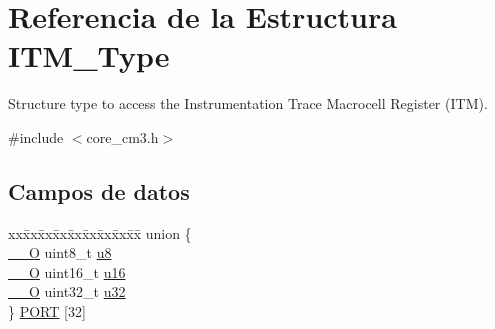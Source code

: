 \hypertarget{struct_i_t_m___type}{}\section{Referencia de la Estructura I\+T\+M\+\_\+\+Type}
\label{struct_i_t_m___type}


Structure type to access the Instrumentation Trace Macrocell Register (I\+TM).  




{\ttfamily \#include $<$core\+\_\+cm3.\+h$>$}

\subsection*{Campos de datos}
\begin{DoxyCompactItemize}
\item 
\begin{tabbing}
xx\=xx\=xx\=xx\=xx\=xx\=xx\=xx\=xx\=\kill
union \{\\
\>\mbox{\hyperlink{core__cm3_8h_a7e25d9380f9ef903923964322e71f2f6}{\_\_O}} uint8\_t \mbox{\hyperlink{struct_i_t_m___type_a0374c0b98ab9de6f71fabff7412df832}{u8}}\\
\>\mbox{\hyperlink{core__cm3_8h_a7e25d9380f9ef903923964322e71f2f6}{\_\_O}} uint16\_t \mbox{\hyperlink{struct_i_t_m___type_ae8d499140220fa6d4eab1da7262bf08e}{u16}}\\
\>\mbox{\hyperlink{core__cm3_8h_a7e25d9380f9ef903923964322e71f2f6}{\_\_O}} uint32\_t \mbox{\hyperlink{struct_i_t_m___type_acaf6d0e14a3d4b541c624913b4a1931e}{u32}}\\
\} \mbox{\hyperlink{struct_i_t_m___type_aca2b00738a4a346efcd8325e18fcfa8a}{PORT}} \mbox{[}32\mbox{]}\\


\end{tabbing}
\end{DoxyCompactItemize}
